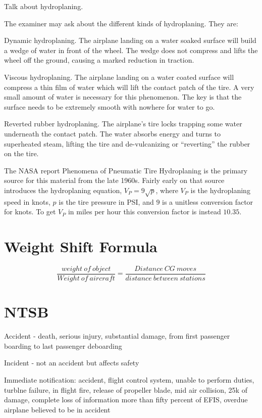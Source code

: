 Talk about hydroplaning.

The examiner may ask about the different kinds of hydroplaning. They are:

Dynamic hydroplaning. The airplane landing on a water soaked surface will build a wedge of water in front of the wheel. The wedge does not compress and lifts the wheel off the ground, causing a marked reduction in traction.

Viscous hydroplaning. The airplane landing on a water coated surface will compress a thin film of water which will lift the contact patch of the tire. A very small amount of water is necessary for this phenomenon. The key is that the surface needs to be extremely smooth with nowhere for water to go.

Reverted rubber hydroplaning. The airplane's tire locks trapping some water underneath the contact patch. The water absorbs energy and turns to superheated steam, lifting the tire and de-vulcanizing or ``reverting'' the rubber on the tire.

The NASA report Phenomena of Pneumatic Tire Hydroplaning \cite{hydroplaning} is the primary source for this material from the late 1960s. Fairly early on that source introduces the hydroplaning equation, $V_P = 9 \sqrt{p}$, where $V_P$ is the hydroplaning speed in knots, $p$ is the tire pressure in PSI, and $9$ is a unitless conversion factor for knots. To get $V_P$ in miles per hour this conversion factor is instead $10.35$.

\section{Weight Shift Formula}

\begin{equation}
    \frac{weight\ of\ object}{Weight\ of\ aircraft} = \frac{Distance\ CG\ moves}{distance\ between\ stations}
\end{equation}

\section{NTSB}

Accident - death, serious injury, substantial damage, from first passenger boarding to last passenger deboarding

Incident - not an accident but affects safety

Immediate notification: accident, flight control system, unable to perform duties, turblne failure, in flight fire, release of propeller blade, mid air collision, 25k of damage, complete loss of information more than fifty percent of EFIS, overdue airplane believed to be in accident

